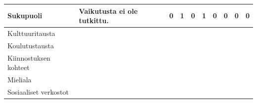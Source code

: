 \documentclass[finnish, 12pt, a4paper, elec, utf8, a-1b, online]{aaltothesis}
\begin{document}
{\begin{longtable}{p{2.5cm}|p{6cm}|p{0.5cm}p{0.5cm}p{0.5cm}|p{0.5cm}|p{0.5cm}p{0.5cm}p{0.5cm}|p{0.5cm}|}
        \midrule
        Sukupuoli & Vaikutusta ei ole tutkittu. & 0 & 1 & 0 & 1 & 0 & 0 & 0 & 0                                                                                                                                                                                                                                                                                                                                                                                                                  \\
        \midrule
        Kulttuuritausta                                                                                                                                                                                                                                                                                                                                                                                                             \\
        \midrule
        Koulutustausta                                                                                                                                                                                                                                                                                                                                                                                                              \\
        \midrule
        Kiinnostuksen kohteet                                                                                                                                                                                                                                                                                                                                                                                                       \\
        \midrule
        Mieliala                                                                                                                                                                                                                                                                                                                                                                                                                    \\
        \midrule
        Sosiaaliset verkostot                                                                                                                                                                                                                                                                                                                                                                                                       \\

\end{longtable}}
\end{document}
